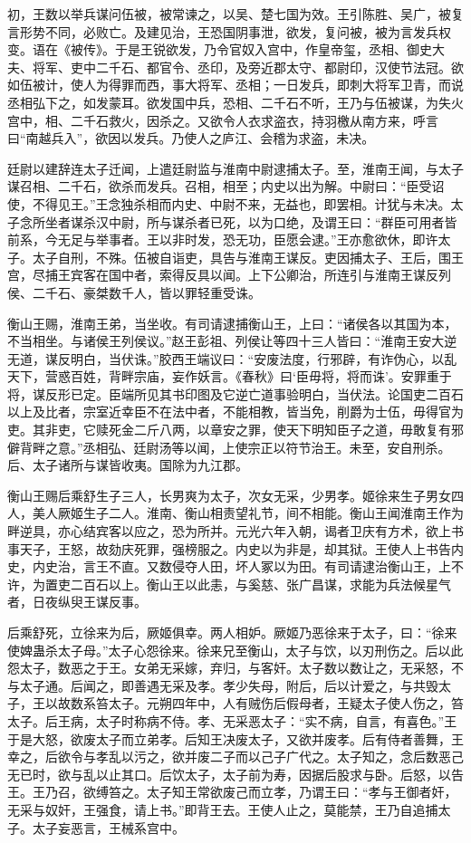 \documentclass[]{article}
\begin{document}
初，王数以举兵谋问伍被，被常谏之，以吴、楚七国为效。王引陈胜、吴广，被复言形势不同，必败亡。及建见治，王恐国阴事泄，欲发，复问被，被为言发兵权变。语在《被传》。于是王锐欲发，乃令官奴入宫中，作皇帝玺，丞相、御史大夫、将军、吏中二千石、都官令、丞印，及旁近郡太守、都尉印，汉使节法冠。欲如伍被计，使人为得罪而西，事大将军、丞相；一日发兵，即刺大将军卫青，而说丞相弘下之，如发蒙耳。欲发国中兵，恐相、二千石不听，王乃与伍被谋，为失火宫中，相、二千石救火，因杀之。又欲令人衣求盗衣，持羽檄从南方来，呼言曰``南越兵入''，欲因以发兵。乃使人之庐江、会稽为求盗，未决。

廷尉以建辞连太子迁闻，上遣廷尉监与淮南中尉逮捕太子。至，淮南王闻，与太子谋召相、二千石，欲杀而发兵。召相，相至；内史以出为解。中尉曰：``臣受诏使，不得见王。''王念独杀相而内史、中尉不来，无益也，即罢相。计犹与未决。太子念所坐者谋杀汉中尉，所与谋杀者已死，以为口绝，及谓王曰：``群臣可用者皆前系，今无足与举事者。王以非时发，恐无功，臣愿会逮。''王亦愈欲休，即许太子。太子自刑，不殊。伍被自诣吏，具告与淮南王谋反。吏因捕太子、王后，围王宫，尽捕王宾客在国中者，索得反具以闻。上下公卿治，所连引与淮南王谋反列侯、二千石、豪桀数千人，皆以罪轻重受诛。

衡山王赐，淮南王弟，当坐收。有司请逮捕衡山王，上曰：``诸侯各以其国为本，不当相坐。与诸侯王列侯议。''赵王彭祖、列侯让等四十三人皆曰：``淮南王安大逆无道，谋反明白，当伏诛。''胶西王端议曰：``安废法度，行邪辟，有诈伪心，以乱天下，营惑百姓，背畔宗庙，妄作妖言。《春秋》曰`臣毋将，将而诛'。安罪重于将，谋反形已定。臣端所见其书印图及它逆亡道事验明白，当伏法。论国吏二百石以上及比者，宗室近幸臣不在法中者，不能相教，皆当免，削爵为士伍，毋得官为吏。其非吏，它赎死金二斤八两，以章安之罪，使天下明知臣子之道，毋敢复有邪僻背畔之意。''丞相弘、廷尉汤等以闻，上使宗正以符节治王。未至，安自刑杀。后、太子诸所与谋皆收夷。国除为九江郡。

衡山王赐后乘舒生子三人，长男爽为太子，次女无采，少男孝。姬徐来生子男女四人，美人厥姬生子二人。淮南、衡山相责望礼节，间不相能。衡山王闻淮南王作为畔逆具，亦心结宾客以应之，恐为所并。元光六年入朝，谒者卫庆有方术，欲上书事天子，王怒，故劾庆死罪，强榜服之。内史以为非是，却其狱。王使人上书告内史，内史治，言王不直。又数侵夺人田，坏人冢以为田。有司请逮治衡山王，上不许，为置吏二百石以上。衡山王以此恚，与奚慈、张广昌谋，求能为兵法候星气者，日夜纵臾王谋反事。

后乘舒死，立徐来为后，厥姬俱幸。两人相妒。厥姬乃恶徐来于太子，曰：``徐来使婢蛊杀太子母。''太子心怨徐来。徐来兄至衡山，太子与饮，以刃刑伤之。后以此怨太子，数恶之于王。女弟无采嫁，弃归，与客奸。太子数以数让之，无采怒，不与太子通。后闻之，即善遇无采及孝。孝少失母，附后，后以计爱之，与共毁太子，王以故数系笞太子。元朔四年中，人有贼伤后假母者，王疑太子使人伤之，笞太子。后王病，太子时称病不侍。孝、无采恶太子：``实不病，自言，有喜色。''王于是大怒，欲废太子而立弟孝。后知王决废太子，又欲并废孝。后有侍者善舞，王幸之，后欲令与孝乱以污之，欲并废二子而以己子广代之。太子知之，念后数恶己无已时，欲与乱以止其口。后饮太子，太子前为寿，因据后股求与卧。后怒，以告王。王乃召，欲缚笞之。太子知王常欲废己而立孝，乃谓王曰：``孝与王御者奸，无采与奴奸，王强食，请上书。''即背王去。王使人止之，莫能禁，王乃自追捕太子。太子妄恶言，王械系宫中。
\end{document}
